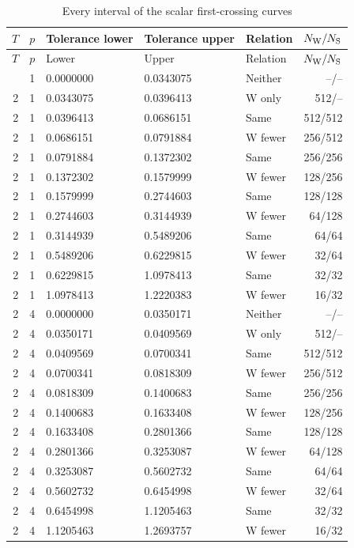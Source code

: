\begin{longtable}{rrlllr}\caption{Every interval of the scalar first-crossing curves}\label{tab:frontierfull47}\\\toprule
$T$ & $p$ & Tolerance lower & Tolerance upper & Relation & $N_{\rm W}/N_{\rm S}$\\\midrule\endfirsthead
\toprule $T$ & $p$ & Lower & Upper & Relation & $N_{\rm W}/N_{\rm S}$\\\midrule\endhead\bottomrule\endfoot
2 & 1 & 0.0000000 & 0.0343075 & Neither & --/-- \\
2 & 1 & 0.0343075 & 0.0396413 & W only & 512/-- \\
2 & 1 & 0.0396413 & 0.0686151 & Same & 512/512 \\
2 & 1 & 0.0686151 & 0.0791884 & W fewer & 256/512 \\
2 & 1 & 0.0791884 & 0.1372302 & Same & 256/256 \\
2 & 1 & 0.1372302 & 0.1579999 & W fewer & 128/256 \\
2 & 1 & 0.1579999 & 0.2744603 & Same & 128/128 \\
2 & 1 & 0.2744603 & 0.3144939 & W fewer & 64/128 \\
2 & 1 & 0.3144939 & 0.5489206 & Same & 64/64 \\
2 & 1 & 0.5489206 & 0.6229815 & W fewer & 32/64 \\
2 & 1 & 0.6229815 & 1.0978413 & Same & 32/32 \\
2 & 1 & 1.0978413 & 1.2220383 & W fewer & 16/32 \\
2 & 4 & 0.0000000 & 0.0350171 & Neither & --/-- \\
2 & 4 & 0.0350171 & 0.0409569 & W only & 512/-- \\
2 & 4 & 0.0409569 & 0.0700341 & Same & 512/512 \\
2 & 4 & 0.0700341 & 0.0818309 & W fewer & 256/512 \\
2 & 4 & 0.0818309 & 0.1400683 & Same & 256/256 \\
2 & 4 & 0.1400683 & 0.1633408 & W fewer & 128/256 \\
2 & 4 & 0.1633408 & 0.2801366 & Same & 128/128 \\
2 & 4 & 0.2801366 & 0.3253087 & W fewer & 64/128 \\
2 & 4 & 0.3253087 & 0.5602732 & Same & 64/64 \\
2 & 4 & 0.5602732 & 0.6454998 & W fewer & 32/64 \\
2 & 4 & 0.6454998 & 1.1205463 & Same & 32/32 \\
2 & 4 & 1.1205463 & 1.2693757 & W fewer & 16/32 \\

\end{longtable}
